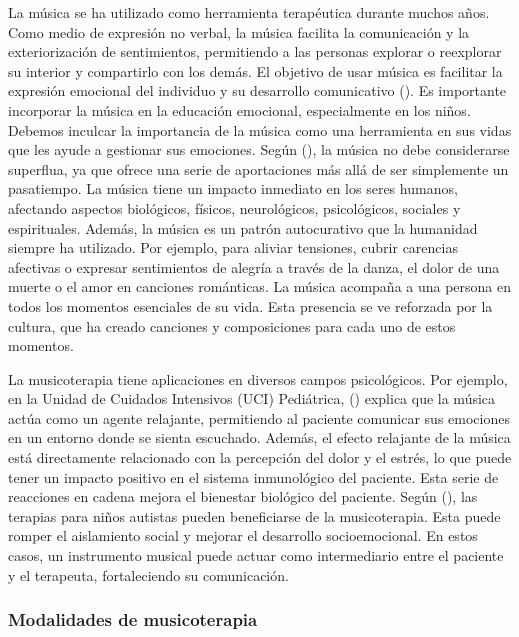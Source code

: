 La música se ha utilizado como herramienta terapéutica durante muchos años. Como medio de expresión no verbal, la música facilita la comunicación y la exteriorización de sentimientos, permitiendo a las personas explorar o reexplorar su interior y compartirlo con los demás. El objetivo de usar música es facilitar la expresión emocional del individuo y su desarrollo comunicativo (\cite{TRESIERRA:2005}). Es importante incorporar la música en la educación emocional, especialmente en los niños. Debemos inculcar la importancia de la música como una herramienta en sus vidas que les ayude a gestionar sus emociones. Según \citeauthor{POCH:2001} (\citeyear{POCH:2001}), la música no debe considerarse superflua, ya que ofrece una serie de aportaciones más allá de ser simplemente un pasatiempo. La música tiene un impacto inmediato en los seres humanos, afectando aspectos biológicos, físicos, neurológicos, psicológicos, sociales y espirituales. Además, la música es un patrón autocurativo que la humanidad siempre ha utilizado. Por ejemplo, para aliviar tensiones, cubrir carencias afectivas o expresar sentimientos de alegría a través de la danza, el dolor de una muerte o el amor en canciones románticas. La música acompaña a una persona en todos los momentos esenciales de su vida. Esta presencia se ve reforzada por la cultura, que ha creado canciones y composiciones para cada uno de estos momentos.

La musicoterapia tiene aplicaciones en diversos campos psicológicos. Por ejemplo, en la Unidad de Cuidados Intensivos (UCI) Pediátrica, \citeauthor{TRESIERRA:2005} (\citeyear{TRESIERRA:2005}) explica que la música actúa como un agente relajante, permitiendo al paciente comunicar sus emociones en un entorno donde se sienta escuchado. Además, el efecto relajante de la música está directamente relacionado con la percepción del dolor y el estrés, lo que puede tener un impacto positivo en el sistema inmunológico del paciente. Esta serie de reacciones en cadena mejora el bienestar biológico del paciente. Según \citeauthor{TRESIERRA:2005} (\citeyear{TRESIERRA:2005}), las terapias para niños autistas pueden beneficiarse de la musicoterapia. Esta puede romper el aislamiento social y mejorar el desarrollo socioemocional. En estos casos, un instrumento musical puede actuar como intermediario entre el paciente y el terapeuta, fortaleciendo su comunicación.

\subsubsection{Modalidades de musicoterapia}

